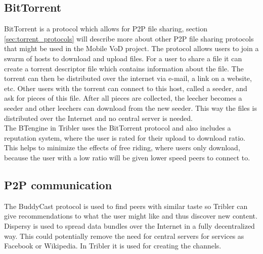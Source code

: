 \subsection{BitTorrent}
BitTorrent is a protocol which allows for P2P file sharing, section \ref{sec:torrent_protocols} will describe more about other P2P file sharing protocols that might be used in the Mobile VoD project. The protocol allows users to join a swarm of hosts to download and upload files. For a user to share a file it can create a torrent descriptor file which contains information about the file. The torrent can then be distributed over the internet via e-mail, a link on a website, etc. Other users with the torrent can connect to this host, called a seeder, and ask for pieces of this file. After all pieces are collected, the leecher becomes a seeder and other leechers can download from the new seeder. This way the files is distributed over the Internet and no central server is needed.\\ 
The BTengine in Tribler uses the BitTorrent protocol and also includes a reputation system, where the user is rated for their upload to download ratio. This helps to minimize the effects of free riding, where users only download, because the user with a low ratio will be given lower speed peers to connect to.

\subsection{P2P communication}
The BuddyCast protocol is used to find peers with similar taste so Tribler can give recommendations to what the user might like and thus discover new content. Dispersy is used to spread data bundles over the Internet in a fully decentralized way. This could potentially remove the need for central servers for services as Facebook or Wikipedia. In Tribler it is used for creating the channels.